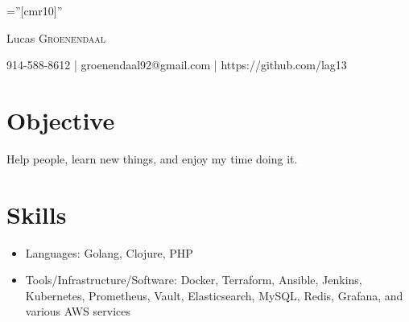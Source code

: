 \documentclass[a4paper,10pt]{article}
\begin{document}

\pagestyle{empty} %

\font\fb=''[cmr10]'' %

\par{\centering
		{\Huge Lucas \textsc{Groenendaal}
  }\par}

\par{\centering
  {\normalsize
  914-588-8612 | groenendaal92@gmail.com | https://github.com/lag13
}\par}
\bigskip

\section{Objective}
Help people, learn new things, and enjoy my time doing it.

\section{Skills}
\begin{itemize}
  \item Languages: Golang, Clojure, PHP
  \item Tools/Infrastructure/Software: Docker, Terraform, Ansible, Jenkins, Kubernetes, Prometheus, Vault, Elasticsearch, MySQL, Redis, Grafana, and various AWS services
\end{itemize}
\end{document}
